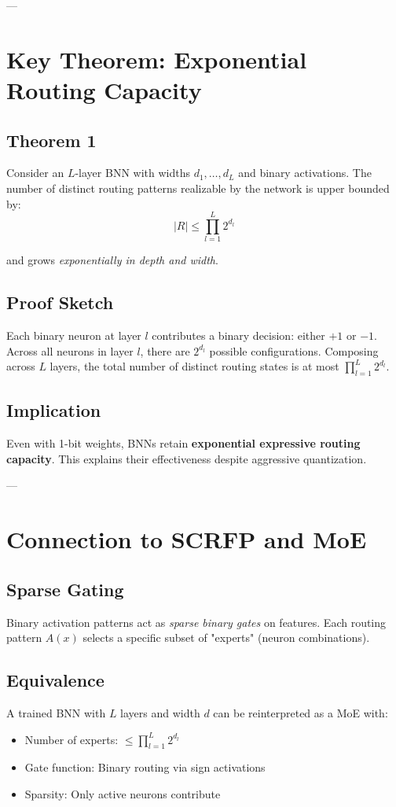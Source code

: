 ---

\section{Key Theorem: Exponential Routing Capacity}

\subsection{Theorem 1}
Consider an $L$-layer BNN with widths $d_1, \ldots, d_L$ and binary activations. 
The number of distinct routing patterns realizable by the network is upper bounded by:
$$|R| \leq \prod_{l=1}^{L} 2^{d_l}$$

and grows \emph{exponentially in depth and width}.

\subsection{Proof Sketch}
Each binary neuron at layer $l$ contributes a binary decision: either $+1$ or $-1$.
Across all neurons in layer $l$, there are $2^{d_l}$ possible configurations.
Composing across $L$ layers, the total number of distinct routing states is at most $\prod_{l=1}^L 2^{d_l}$.

\subsection{Implication}
Even with 1-bit weights, BNNs retain \textbf{exponential expressive routing capacity}.
This explains their effectiveness despite aggressive quantization.

---

\section{Connection to SCRFP and MoE}

\subsection{Sparse Gating}
Binary activation patterns act as \emph{sparse binary gates} on features.
Each routing pattern $A(x)$ selects a specific subset of "experts" (neuron combinations).

\subsection{Equivalence}
A trained BNN with $L$ layers and width $d$ can be reinterpreted as a MoE with:
\begin{itemize}
  \item Number of experts: $\leq \prod_{l=1}^L 2^{d_l}$
  \item Gate function: Binary routing via sign activations
  \item Sparsity: Only active neurons contribute
\end{itemize}

